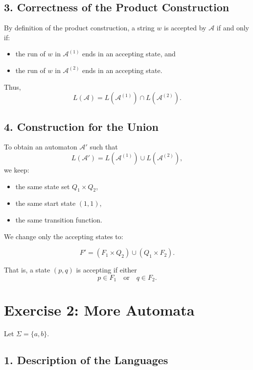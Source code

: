 \documentclass{article}
\theoremstyle{theorem}
\theoremstyle{definition}
\theoremstyle{remark}
\begin{document}
\subsection*{3. Correctness of the Product Construction}

By definition of the product construction, a string $w$ is accepted by $\mathcal A$ if and only if:

\begin{itemize}
    \item the run of $w$ in $\mathcal A^{(1)}$ ends in an accepting state, and
    \item the run of $w$ in $\mathcal A^{(2)}$ ends in an accepting state.
\end{itemize}

Thus,
\[
L(\mathcal A)
=
L(\mathcal A^{(1)}) \cap L(\mathcal A^{(2)}).
\]

\bigskip

\subsection*{4. Construction for the Union}

To obtain an automaton $\mathcal A'$ such that
\[
L(\mathcal A') = L(\mathcal A^{(1)}) \cup L(\mathcal A^{(2)}),
\]
we keep:

\begin{itemize}
    \item the same state set $Q_1 \times Q_2$,
    \item the same start state $(1,1)$,
    \item the same transition function.
\end{itemize}

We change only the accepting states to:

\[
F' = (F_1 \times Q_2) \cup (Q_1 \times F_2).
\]

That is, a state $(p,q)$ is accepting if either
\[
p \in F_1 \quad \text{or} \quad q \in F_2.
\]

\section*{Exercise 2: More Automata}

Let $\Sigma = \{a,b\}$.

\subsection*{1. Description of the Languages}
\end{document}

